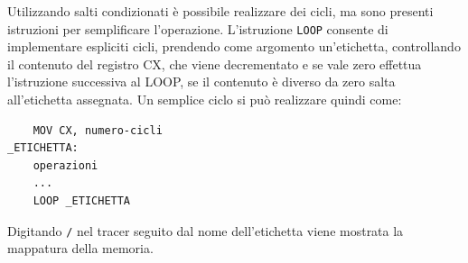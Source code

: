 \documentclass{article}
\numberwithin{equation}{subsection}
\begin{document}
Utilizzando salti condizionati è possibile realizzare dei cicli, ma sono presenti istruzioni per semplificare l'operazione. L'istruzione \verb|LOOP| 
consente di implementare espliciti cicli, prendendo come argomento un'etichetta, controllando il contenuto del registro CX, che viene decrementato e 
se vale zero effettua l'istruzione successiva al LOOP, se il contenuto è diverso da zero salta all'etichetta assegnata. Un semplice ciclo si può realizzare quindi come:
\begin{verbatim}
    MOV CX, numero-cicli
_ETICHETTA:  
    operazioni 
    ...
    LOOP _ETICHETTA
\end{verbatim}



Digitando \verb|/| nel tracer seguito dal nome dell'etichetta viene mostrata la mappatura della memoria. 
\end{document}
